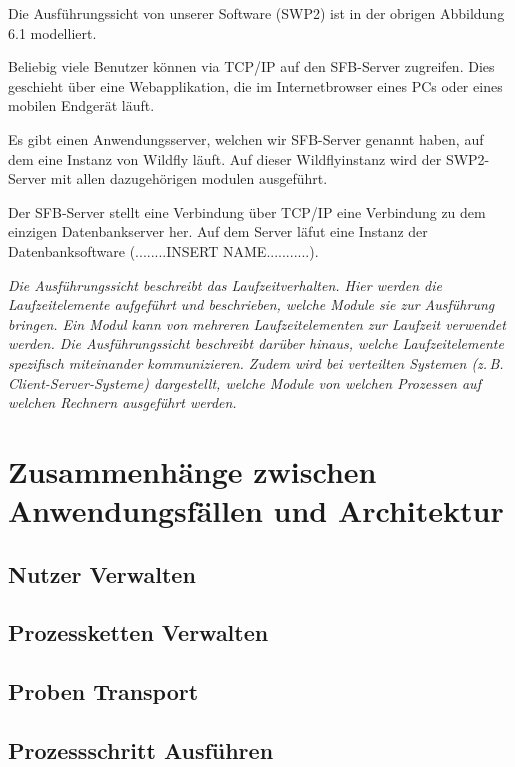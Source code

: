\documentclass[enabledeprecatedfontcommands,fontsize=12pt,paper=a4,twoside]{scrartcl}
\begin{document}
{ Die Ausführungssicht von unserer Software (SWP2) ist in der obrigen Abbildung 6.1 modelliert.

Beliebig viele Benutzer können via TCP/IP auf den SFB-Server zugreifen. Dies geschieht über eine Webapplikation, die im Internetbrowser eines PCs oder eines mobilen Endgerät läuft.

Es gibt einen Anwendungsserver, welchen wir SFB-Server genannt haben, auf dem eine Instanz von Wildfly läuft. Auf dieser Wildflyinstanz wird der SWP2-Server mit allen dazugehörigen modulen ausgeführt.

Der SFB-Server stellt eine Verbindung über TCP/IP eine Verbindung zu dem einzigen Datenbankserver her. Auf dem Server läfut eine Instanz der Datenbanksoftware (........INSERT NAME...........).

}

{\it
Die Ausführungssicht beschreibt das Laufzeitverhalten. Hier
werden die Laufzeitelemente aufgeführt und beschrieben, welche Module
sie zur Ausführung bringen. Ein Modul kann von mehreren
Laufzeitelementen zur Laufzeit verwendet werden. Die Ausführungssicht
beschreibt darüber hinaus, welche Laufzeitelemente spezifisch
miteinander kommunizieren. Zudem wird bei verteilten Systemen
(z.\,B. Client-Server-Systeme) dargestellt, welche Module von welchen
Prozessen auf welchen Rechnern ausgeführt werden.}


\section[Zusammenhänge zwischen Anwendungsfällen und Architektur]{Zusammenhänge zwischen Anwendungsfällen und Architektur}
\label{sec:anwendungsfaelle}

\subsection{Nutzer Verwalten}
\subsection{Prozessketten Verwalten}
\subsection{Proben Transport}
\subsection{Prozessschritt Ausführen}
\end{document}
